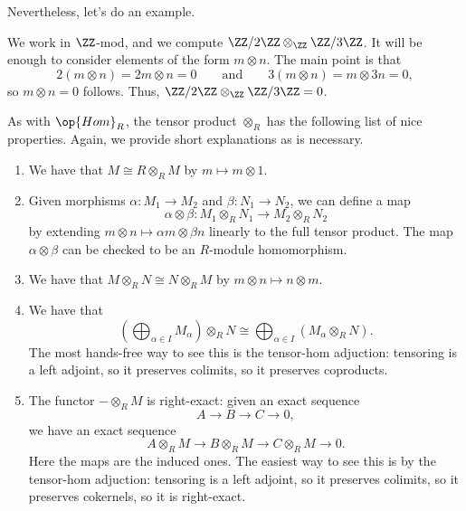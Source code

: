 Nevertheless, let's do an example.
\begin{example}
	We work in $\ZZ$-mod, and we compute $\ZZ/2\ZZ\otimes_\ZZ\ZZ/3\ZZ$. It will be enough to consider elements of the form $m\otimes n$. The main point is that
	\[2(m\otimes n)=2m\otimes n=0\qquad\text{and}\qquad3(m\otimes n)=m\otimes3n=0,\]
	so $m\otimes n=0$ follows. Thus, $\ZZ/2\ZZ\otimes_\ZZ\ZZ/3\ZZ=0$.
\end{example}
As with $\op{Hom}_R$, the tensor product $\otimes_R$ has the following list of nice properties. Again, we provide short explanations as is necessary.
\begin{enumerate}
	\item We have that $M\cong R\otimes_RM$ by $m\mapsto m\otimes1$.
	\item Given morphisms $\alpha:M_1\to M_2$ and $\beta:N_1\to N_2$, we can define a map
	\[\alpha\otimes\beta:M_1\otimes_R N_1\to M_2\otimes_R N_2\]
	by extending $m\otimes n\mapsto\alpha m\otimes\beta n$ linearly to the full tensor product. The map $\alpha\otimes\beta$ can be checked to be an $R$-module homomorphism.
	\item We have that $M\otimes_R N\cong N\otimes_R M$ by $m\otimes n\mapsto n\otimes m$.
	\item We have that
	\[\left(\bigoplus_{\alpha\in I}M_\alpha\right)\otimes_RN\cong\bigoplus_{\alpha\in I}(M_\alpha\otimes_R N).\]
	The most hands-free way to see this is the tensor-hom adjuction: tensoring is a left adjoint, so it preserves colimits, so it preserves coproducts.
	\item The functor $-\otimes_RM$ is right-exact: given an exact sequence
	\[A\to B\to C\to 0,\]
	we have an exact sequence
	\[A\otimes_RM\to B\otimes_RM\to C\otimes_RM\to 0.\]
	Here the maps are the induced ones. The easiest way to see this is by the tensor-hom adjuction: tensoring is a left adjoint, so it preserves colimits, so it preserves cokernels, so it is right-exact.
\end{enumerate}

